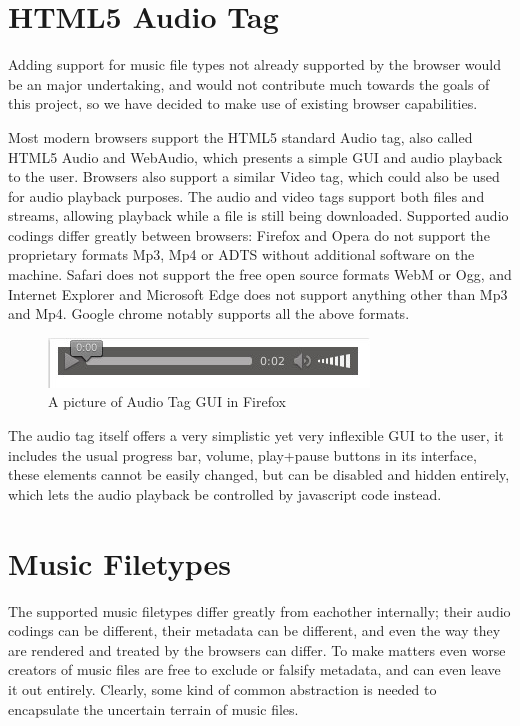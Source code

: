 \section{HTML5 Audio Tag}
Adding support for music file types not already supported by the browser 
would be an major undertaking, 
and would not contribute much towards the goals of this project, 
so we have decided to make use of existing browser capabilities.
\newline

Most modern browsers support the HTML5 standard Audio tag,
also called HTML5 Audio and WebAudio,
which presents a simple GUI and audio playback to the user.
Browsers also support a similar Video tag, 
which could also be used for audio playback purposes.
The audio and video tags support both files and streams, 
allowing playback while a file is still being downloaded.
\newline
Supported audio codings differ greatly between browsers:
Firefox and Opera do not support the proprietary formats Mp3, Mp4 or ADTS
without additional software on the machine.
Safari does not support the free open source formats WebM or Ogg,
and Internet Explorer and Microsoft Edge does not support anything other than Mp3 and Mp4.
Google chrome notably supports all the above formats.
\newline

\begin{figure}[h]
  \centering
    \includegraphics[]{gfx/audioTag.jpg}
  \caption{A picture of Audio Tag GUI in Firefox}
  \label{fig:audiotag}
\end{figure}

The audio tag itself offers a very simplistic yet very inflexible GUI to the user, 
it includes the usual progress bar, volume, play+pause buttons in its interface, 
these elements cannot be easily changed, but can be disabled and hidden entirely, 
which lets the audio playback be controlled by javascript code instead.
\newline

\section{Music Filetypes}
The supported music filetypes differ greatly from eachother internally; 
their audio codings can be different, their metadata can be different,
and even the way they are rendered and treated by the browsers can differ.
To make matters even worse creators of music files are free to exclude or falsify metadata, 
and can even leave it out entirely.
Clearly, some kind of common abstraction is needed to encapsulate the uncertain terrain of music files.
\newline


